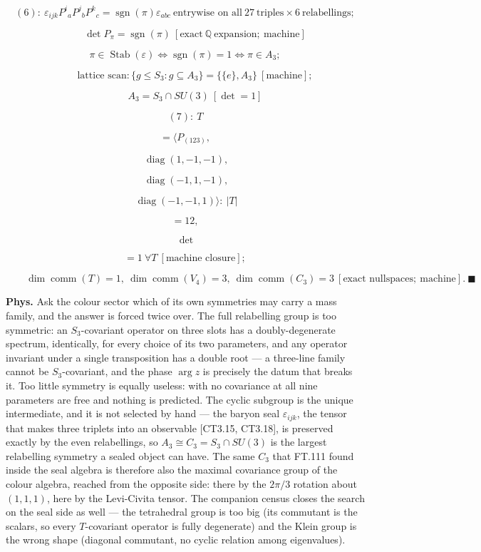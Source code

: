 \begin{theorem}
\[
(6):\ \varepsilon_{ijk}P^i{}_aP^j{}_bP^k{}_c=\operatorname{sgn}(\pi)\varepsilon_{abc}\ \text{entrywise on all}\ 27\ \text{triples}\times6\ \text{relabellings};
\]

\[
\qquad \det P_\pi=\operatorname{sgn}(\pi)\ [\text{exact}\ \mathbb Q\ \text{expansion};\ \text{machine}]
\]

\[
\pi\in\operatorname{Stab}(\varepsilon)\iff\operatorname{sgn}(\pi)=1\iff\pi\in A_3;
\]

\[
\qquad \text{lattice scan}: \{g\le S_3:g\subseteq A_3\}=\{\{e\},A_3\}\ [\text{machine}];
\]

\[
\qquad A_3=S_3\cap SU(3)\ [\det=1]
\]

\[
(7):\ T
\]

\[
= \langle P_{(123)},
\]

\[
\ \operatorname{diag}(1,-1,-1),
\]

\[
\ \operatorname{diag}(-1,1,-1),
\]

\[
\ \operatorname{diag}(-1,-1,1)\rangle:\ |T|
\]

\[
= 12,
\]

\[
\ \det
\]

\[
= 1\ \forall T\ [\text{machine closure}];
\]

\[
\qquad \dim\operatorname{comm}(T)=1,\ \dim\operatorname{comm}(V_4)=3,\ \dim\operatorname{comm}(C_3)=3\ [\text{exact nullspaces};\ \text{machine}].\ \blacksquare
\]

\textbf{Phys.} Ask the colour sector which of its own symmetries may carry a mass family, and the answer is forced twice over. The full relabelling group is too symmetric: an $S_3$-covariant operator on three slots has a doubly-degenerate spectrum, identically, for every choice of its two parameters, and any operator invariant under a single transposition has a double root — a three-line family cannot be $S_3$-covariant, and the phase $\arg z$ is precisely the datum that breaks it. Too little symmetry is equally useless: with no covariance at all nine parameters are free and nothing is predicted. The cyclic subgroup is the unique intermediate, and it is not selected by hand — the baryon seal $\varepsilon_{ijk}$, the tensor that makes three triplets into an observable [CT3.15, CT3.18], is preserved exactly by the even relabellings, so $A_3\cong C_3=S_3\cap SU(3)$ is the largest relabelling symmetry a sealed object can have. The same $C_3$ that FT.111 found inside the seal algebra is therefore also the maximal covariance group of the colour algebra, reached from the opposite side: there by the $2\pi/3$ rotation about $(1,1,1)$, here by the Levi-Civita tensor. The companion census closes the search on the seal side as well — the tetrahedral group is too big (its commutant is the scalars, so every $T$-covariant operator is fully degenerate) and the Klein group is the wrong shape (diagonal commutant, no cyclic relation among eigenvalues).


\end{theorem}
